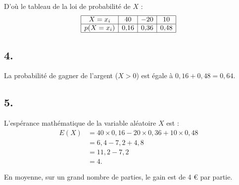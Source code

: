 D'où le tableau de la loi de probabilité de \(X\) :
\[
\begin{array}{|c|c|c|c|}
\hline
X = x_i& 40 & -20 & 10 \\
\hline
p(X = x_i) & 0{,}16 & 0{,}36 & 0{,}48 \\
\hline
\end{array}
\]

\subsection*{4.}

La probabilité de gagner de l’argent (\(X > 0\)) est égale à \(0{,}16 + 0{,}48 = 0{,}64\).

\subsection*{5.}

L’espérance mathématique de la variable aléatoire \(X\) est :
\begin{align*}
E(X) &= 40 \times 0{,}16 - 20 \times 0{,}36 + 10 \times 0{,}48 \\
&= 6{,}4 - 7{,}2 + 4{,}8 \\
&= 11{,}2 - 7{,}2 \\
&= 4.
\end{align*}

En moyenne, sur un grand nombre de parties, le gain est de 4 € par partie.
